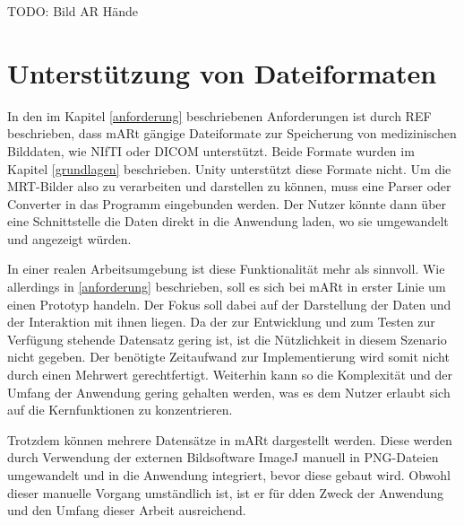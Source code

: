TODO: 
Bild AR Hände


\section{Unterstützung von Dateiformaten} 

In den im Kapitel \ref{anforderung} beschriebenen Anforderungen ist durch REF beschrieben, dass mARt gängige Dateiformate zur Speicherung von medizinischen Bilddaten, wie NIfTI oder DICOM unterstützt. Beide Formate wurden im Kapitel \ref{grundlagen} beschrieben. 
Unity unterstützt diese Formate nicht. Um die MRT-Bilder also zu verarbeiten und darstellen zu können, muss eine Parser oder Converter in das Programm eingebunden werden. 
Der Nutzer könnte dann über eine Schnittstelle die Daten direkt in die Anwendung laden, wo sie umgewandelt und angezeigt würden. 

In einer realen Arbeitsumgebung ist diese Funktionalität mehr als sinnvoll. Wie allerdings in \ref{anforderung} beschrieben, soll es sich bei mARt in erster Linie um einen Prototyp handeln.
Der Fokus soll dabei auf der Darstellung der Daten und der Interaktion mit ihnen liegen. Da der zur Entwicklung und zum Testen zur Verfügung stehende Datensatz gering ist, ist die Nützlichkeit in diesem Szenario nicht gegeben. Der benötigte Zeitaufwand zur Implementierung wird somit nicht durch einen Mehrwert gerechtfertigt.
Weiterhin kann so die Komplexität und der Umfang der Anwendung gering gehalten werden, was es dem Nutzer erlaubt sich auf die Kernfunktionen zu konzentrieren. 

Trotzdem können mehrere Datensätze in mARt dargestellt werden. Diese werden durch Verwendung der externen Bildsoftware ImageJ manuell in PNG-Dateien umgewandelt und in die Anwendung integriert, bevor diese gebaut wird. 
Obwohl dieser manuelle Vorgang umständlich ist, ist er für dden Zweck der Anwendung und den Umfang dieser Arbeit ausreichend.
